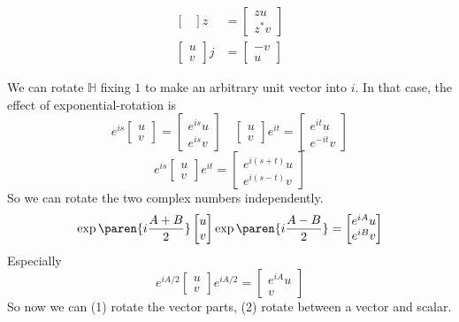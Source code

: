 \documentclass{scrartcl}
\newcommand{\ham}{\mathbb H}
\begin{document}
\begin{multicols*}{2}
\begin{minipage}{.5\linewidth}
\begin{align*}
\begin{bmatrix}
    \end{bmatrix} z &=
                      \begin{bmatrix}
                        zu \\  z^*v
                      \end{bmatrix} \\
    \begin{bmatrix}
      u \\ v
    \end{bmatrix} j &=
                      \begin{bmatrix}
                        -v \\ u
                      \end{bmatrix}
  \end{align*}
\end{minipage}
We can rotate \(\ham\) fixing \(1\) to make an arbitrary unit vector into \(i\). In that case, the effect of exponential-rotation is
\[
  e^{is}
  \begin{bmatrix}
    u \\ v
  \end{bmatrix}
  =
  \begin{bmatrix}
    e^{is} u \\ e^{is} v
  \end{bmatrix}
  \quad
  \begin{bmatrix}
    u \\v
  \end{bmatrix}
  e^{it} =
  \begin{bmatrix}
    e^{it} u \\ e^{-it} v
  \end{bmatrix}
\]
\[
  e^{is}
  \begin{bmatrix}
    u \\ v
  \end{bmatrix}
  e^{it}
  =
  \begin{bmatrix}
    e^{i(s+t)} u \\ e^{i(s-t)} v
  \end{bmatrix}
\]
So we can rotate the two complex numbers independently.
\[
  \exp\paren{i\frac{A+ B}2}
  \begin{bmatrix}
    u \\ v
  \end{bmatrix}
  \exp \paren{i\frac{A-B}2}
  =
  \begin{bmatrix}
    e^{iA} u \\ e^{iB}v
  \end{bmatrix}
\]
Especially
\[
  e^{iA/2}
  \begin{bmatrix}
    u \\v
  \end{bmatrix}
  e^{iA/2}
  =
  \begin{bmatrix}
    e^{iA} u \\ v
  \end{bmatrix}
\]
So now we can (1) rotate the vector parts, (2) rotate between a vector and scalar.


\end{multicols*}
\end{document}

